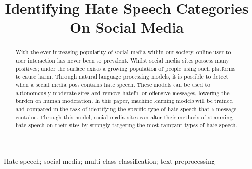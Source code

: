 \documentclass[conference]{IEEEtran}
\begin{document}
\title{Identifying Hate Speech Categories On Social Media\\
}

\author{
}

\maketitle

\begin{abstract}
With the ever increasing popularity of social media within our society, online user-to-user interaction has never been so prevalent. Whilst social media sites possess many positives; under the surface exists a growing population of people using such platforms to cause harm. Through natural language processing models, it is possible to detect when a social media post contains hate speech. These models can be used to autonomously moderate sites and remove hateful or offensive messages, lowering the burden on human moderation. In this paper, machine learning models will be trained and compared in the task of identifying the specific type of hate speech that a message contains. Through this model, social media sites can alter their methods of stemming hate speech on their sites by strongly targeting the most rampant types of hate speech. \\
\end{abstract}

\begin{IEEEkeywords}
Hate speech; social media; multi-class classification; text preprocessing 
\end{IEEEkeywords}
\end{document}
